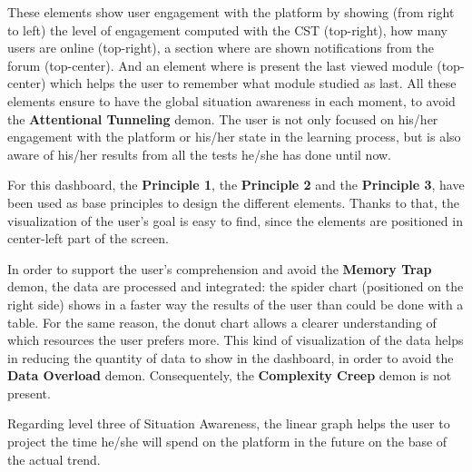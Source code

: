 These elements show user engagement with the platform by showing (from right to left)
the level of engagement computed with the CST (top-right),
how many users are online (top-right), a section
where are shown notifications from the forum (top-center). 
And an element where is present the last viewed module (top-center) which helps the user
to remember what module studied as last.
All these elements ensure to have the global situation awareness in each moment, 
to avoid the \textbf{Attentional Tunneling} demon. The user is not only focused
on his/her engagement with the platform or his/her state in the learning process, but is
also aware of his/her results from all the tests he/she has done until now.

For this dashboard, the \textbf{Principle 1}, the \textbf{Principle 2} and the \textbf{Principle 3},
have been used as base principles to design the different elements. Thanks to that, the 
visualization of the user's goal is easy to find, since the elements are positioned in center-left
part of the screen. 

In order to support the user's comprehension and avoid the 
\textbf{Memory Trap} demon, the data are processed and integrated: the spider chart
(positioned on the right side) shows in a faster way the results of the user than
could be done with a table. For the same reason, the donut chart allows a clearer 
understanding of which resources the user prefers more. This kind of visualization of the
data helps in reducing the quantity of data to show in the dashboard, in order to 
avoid the \textbf{Data Overload} demon. Consequentely, the \textbf{Complexity Creep} demon is not present.

Regarding level three of
Situation Awareness, the linear graph helps the user to project the time he/she will
spend on the platform in the future on the base of the actual trend.


